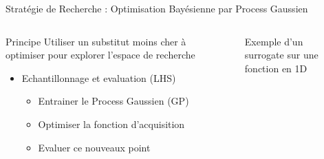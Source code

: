 \begin{frame}{Stratégie de Recherche : Optimisation Bayésienne par Process Gaussien }
    \begin{columns}
    \begin{column}[t]{0.45\textwidth} 
        \vspace*{5pt}
        \begin{block}{Principe}
            Utiliser un substitut moins cher à optimiser pour explorer l'espace de recherche
        \end{block}
        \hfill
        \begin{block}{}
                \begin{itemize}
                    \item<1-> Echantillonnage et evaluation (LHS)
                    \begin{itemize}
                        \setlength{\itemindent}{5pt}
                        \item<2-> Entrainer le Process Gaussien (GP)
                        \item<3-> Optimiser la fonction d'acquisition
                        \item<3-> Evaluer ce nouveaux point
                    \end{itemize}
                \end{itemize}
        \end{block}
        \end{column}
        
             
        \begin{column}[t]{0.55\textwidth}
            \hspace*{-10pt}
            \vspace*{-8pt}
            \begin{figure}
                \centering
                
                \hspace*{-5pt}\caption{Exemple d'un surrogate sur une fonction en 1D}
            \end{figure} 
        \end{column}
    \end{columns}

\end{frame}

